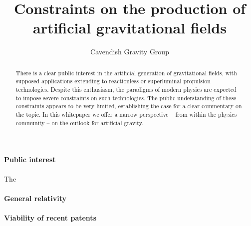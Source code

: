 \documentclass[aps,prd,reprint,preprintnumbers,showpacs,floatfix,nofootinbib,superscript address,longbibliography]{revtex4-2}
\begin{document}
\title{Constraints on the production of artificial gravitational fields}

\author{Cavendish Gravity Group}


\begin{abstract}
	There is a clear public interest in the artificial generation of gravitational fields, with supposed applications extending to reactionless or superluminal propulsion technologies. Despite this enthusiasm, the paradigms of modern physics are expected to impose severe constraints on such technologies. The public understanding of these constraints appears to be very limited, establishing the case for a clear commentary on the topic. In this whitepaper we offer a narrow perspective -- from within the physics community -- on the outlook for artificial gravity.
\end{abstract}

\maketitle

\paragraph*{Public interest} The
\paragraph*{General relativity}
\paragraph*{Viability of recent patents}
\end{document}
